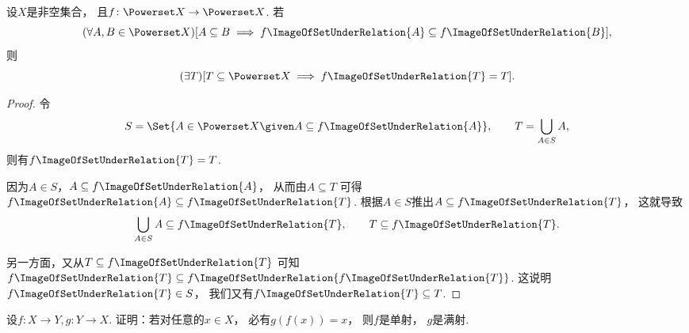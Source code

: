 \begin{example}
设\(X\)是非空集合，
且\(f\colon \Powerset X \to \Powerset X\).
若\begin{equation*}
	(\forall A,B \in \Powerset X)
	[
		A \subseteq B
		\implies
		f\ImageOfSetUnderRelation{A} \subseteq f\ImageOfSetUnderRelation{B}
	],
\end{equation*}
则\begin{equation*}
	(\exists T)
	[
		T \subseteq \Powerset X
		\implies
		f\ImageOfSetUnderRelation{T} = T
	].
\end{equation*}
\begin{proof}
令\begin{equation*}
	S = \Set{ A \in \Powerset X \given A \subseteq f\ImageOfSetUnderRelation{A} },
	\qquad
	T = \bigcup_{A \in S} A,
\end{equation*}
则有\(f\ImageOfSetUnderRelation{T} = T\).

因为\(A \in S\)，\(A \subseteq f\ImageOfSetUnderRelation{A}\)，
从而由\(A \subseteq T\)
可得\(f\ImageOfSetUnderRelation{A} \subseteq f\ImageOfSetUnderRelation{T}\).
根据\(A \in S\)推出\(A \subseteq f\ImageOfSetUnderRelation{T}\)，
这就导致\begin{equation*}
	\bigcup_{A \in S} A \subseteq f\ImageOfSetUnderRelation{T},
	\qquad
	T \subseteq f\ImageOfSetUnderRelation{T}.
\end{equation*}

另一方面，又从\(T \subseteq f\ImageOfSetUnderRelation{T}\)
可知\(f\ImageOfSetUnderRelation{T} \subseteq f\ImageOfSetUnderRelation{f\ImageOfSetUnderRelation{T}}\).
这说明\(f\ImageOfSetUnderRelation{T} \in S\)，
我们又有\(f\ImageOfSetUnderRelation{T} \subseteq T\).
\end{proof}
\end{example}
\begin{example}
设\(f\colon X \to Y,
g\colon Y \to X\).
证明：若对任意的\(x \in X\)，
必有\(g(f(x)) = x\)，
则\(f\)是单射，
\(g\)是满射.
\end{example}

